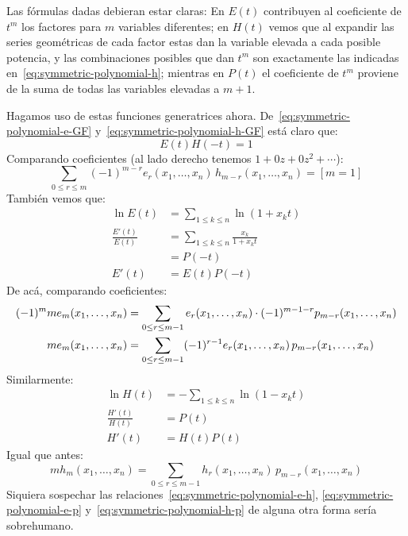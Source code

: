   Las fórmulas dadas debieran estar claras:
  En \(E(t)\) contribuyen al coeficiente de \(t^m\)
  los factores para \(m\) variables diferentes;
  en \(H(t)\)
  vemos que al expandir las series geométricas de cada factor
  estas dan la variable elevada a cada posible potencia,
  y las combinaciones posibles que dan \(t^m\)
  son exactamente
  las indicadas en~\eqref{eq:symmetric-polynomial-h};
  mientras en \(P(t)\) el coeficiente de \(t^m\)
  proviene de la suma de todas las variables elevadas a \(m + 1\).

  Hagamos uso de estas funciones generatrices ahora.
  De~\eqref{eq:symmetric-polynomial-e-GF}
  y~\eqref{eq:symmetric-polynomial-h-GF} está claro que:
  \begin{equation*}
    E(t) H(-t)
      = 1
  \end{equation*}
  Comparando coeficientes
  (al lado derecho tenemos \(1 + 0 z + 0 z^2 + \dotsb\)):
  \begin{equation}
    \label{eq:symmetric-polynomial-e-h}
    \sum_{0 \le r \le m}
      (-1)^{m - r} e_r (x_1, \dotsc, x_n) \, h_{m - r} (x_1, \dotsc, x_n)
      = [m = 1]
  \end{equation}
  También vemos que:
  \begin{align*}
    \ln E(t)
      &= \sum_{1 \le k \le n} \ln (1 + x_k t) \\
    \frac{E'(t)}{E(t)}
      &= \sum_{1 \le k \le n} \frac{x_k}{1 + x_k t} \\
      &= P(-t) \\
    E'(t)
      &= E(t) P(-t)
  \end{align*}
  De acá,
  comparando coeficientes:
  \begin{align}
    (-1)^m m e_m (x_1, \dotsc, x_n)
      &= \sum_{0 \le r \le m - 1}
	   e_r (x_1, \dotsc, x_n)
	     \cdot (-1)^{m - 1 - r} p_{m - r} (x_1, \dotsc, x_n)
	 \notag \\
    m e_m (x_1, \dotsc, x_n)
      &= \sum_{0 \le r \le m - 1}
	   (-1)^{r - 1} e_r (x_1, \dotsc, x_n)
	     \, p_{m - r} (x_1, \dotsc, x_n)
    \label{eq:symmetric-polynomial-e-p}
  \end{align}
  Similarmente:
  \begin{align*}
    \ln H(t)
      &= - \sum_{1 \le k \le n} \ln (1 - x_k t) \\
    \frac{H'(t)}{H(t)}
      &= P(t) \\
    H'(t)
      &= H(t) P(t)
  \end{align*}
  Igual que antes:
  \begin{equation}
    \label{eq:symmetric-polynomial-h-p}
    m h_m (x_1, \dotsc, x_n)
      = \sum_{0 \le r \le m - 1}
	   h_r (x_1, \dotsc, x_n) \, p_{m - r} (x_1, \dotsc, x_n)
  \end{equation}
  Siquiera sospechar
  las relaciones~\eqref{eq:symmetric-polynomial-e-h},
  \eqref{eq:symmetric-polynomial-e-p}
  y~\eqref{eq:symmetric-polynomial-h-p}
  de alguna otra forma sería sobrehumano.

